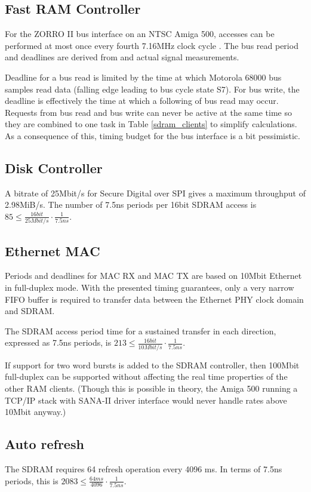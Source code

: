 \documentclass[a4paper]{report}
\begin{document}
\subsection{Fast RAM Controller}
For the ZORRO II bus interface on an NTSC Amiga 500,
accesses can be performed at most once every fourth 7.16MHz
clock cycle \cite{mc68000um}.  The bus read period and
deadlines are derived from \cite{mc68000um} and actual signal
measurements.

Deadline for a bus read is limited by the time at which Motorola
68000 bus samples read data (falling edge leading to bus cycle
state S7).  For bus write, the deadline is effectively the time
at which a following of bus read may occur.  Requests from
bus read and bus write can never be active at the same time
so they are combined to one task in Table \ref{sdram_clients}
to simplify calculations. As a consequence of this, timing
budget for the bus interface is a bit pessimistic.

\subsection{Disk Controller}
A bitrate of 25Mbit/s for Secure Digital over SPI gives a
maximum throughput of 2.98MiB/s. The number of 7.5ns periods
per 16bit SDRAM access is
$85 \le \frac{16 bit}{25 Mbit/s}\cdot \frac{1}{7.5 ns}$.

\subsection{Ethernet MAC}
Periods and deadlines for MAC RX and MAC TX are based on
\si{10}{Mbit} Ethernet in full-duplex mode. With the presented
timing guarantees, only a very narrow FIFO buffer is required
to transfer data between the Ethernet PHY clock domain and
SDRAM. 

The SDRAM access period time for a sustained transfer in each
direction, expressed as 7.5ns periods, is
$213 \le \frac{16 bit}{10 Mbit/s}\cdot \frac{1}{7.5 ns}$.

If support for two word bursts is added to the SDRAM
controller, then \si{100}{Mbit} full-duplex can be supported
without affecting the real time properties of the other RAM
clients. (Though this is possible in theory, the Amiga 500 running
a TCP/IP stack with SANA-II driver interface would never handle
rates above \si{10}{Mbit} anyway.)

\subsection{Auto refresh}
The SDRAM requires 64 refresh operation every 4096 ms. In terms
of 7.5ns periods, this is
$2083 \le \frac{64 ms}{4096}\cdot \frac{1}{7.5 ns}$.
\end{document}
